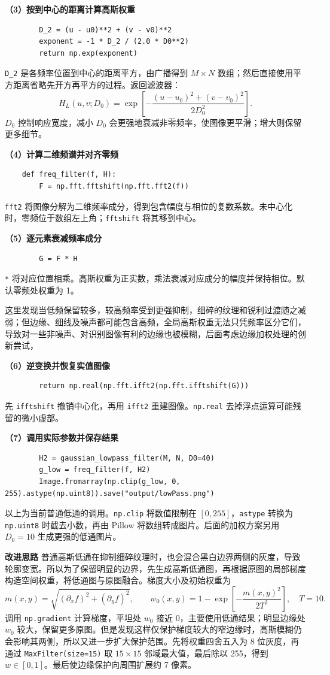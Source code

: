 \documentclass[UTF8,a4paper,zihao=5,fontset=fandol]{ctexart}
\begin{document}
\textbf{（3）按到中心的距离计算高斯权重}
{\small
\begin{verbatim}
        D_2 = (u - u0)**2 + (v - v0)**2
        exponent = -1 * D_2 / (2.0 * D0**2)
        return np.exp(exponent)
\end{verbatim}
}
\texttt{D\_2} 是各频率位置到中心的距离平方，由广播得到 $M\times N$ 数组；然后直接使用平方距离省略先开方再平方的过程。返回滤波器：
\[
H_L(u,v;D_0)=\exp\left[-\frac{(u-u_0)^2+(v-v_0)^2}{2D_0^2}\right].
\]
$D_0$ 控制响应宽度，减小 $D_0$ 会更强地衰减非零频率，使图像更平滑；增大则保留更多细节。

\textbf{（4）计算二维频谱并对齐零频}
{\small
\begin{verbatim}
    def freq_filter(f, H):
        F = np.fft.fftshift(np.fft.fft2(f))
\end{verbatim}
}
\texttt{fft2} 将图像分解为二维频率成分，得到包含幅度与相位的复数系数。未中心化时，零频位于数组左上角；\texttt{fftshift} 将其移到中心。

\textbf{（5）逐元素衰减频率成分}
{\small
\begin{verbatim}
        G = F * H
\end{verbatim}
}
\texttt{*} 将对应位置相乘。高斯权重为正实数，乘法衰减对应成分的幅度并保持相位。默认零频处权重为 1。

这里发现当低频保留较多，较高频率受到更强抑制，细碎的纹理和锐利过渡随之减弱；但边缘、细线及噪声都可能包含高频，全局高斯权重无法只凭频率区分它们，导致对一些非噪声、对识别图像有利的边缘也被模糊，后面考虑边缘加权处理的创新尝试，

\textbf{（6）逆变换并恢复实值图像}
{\small
\begin{verbatim}
        return np.real(np.fft.ifft2(np.fft.ifftshift(G)))
\end{verbatim}
}
先 \texttt{ifftshift} 撤销中心化，再用 \texttt{ifft2} 重建图像。\texttt{np.real} 去掉浮点运算可能残留的微小虚部。

\textbf{（7）调用实际参数并保存结果}
{\small
\begin{verbatim}
        H2 = gaussian_lowpass_filter(M, N, D0=40)
        g_low = freq_filter(f, H2)
        Image.fromarray(np.clip(g_low, 0, 255).astype(np.uint8)).save("output/lowPass.png")
\end{verbatim}
}
以上为当前普通低通的调用。\texttt{np.clip} 将数值限制在 $[0,255]$，\texttt{astype} 转换为 \texttt{np.uint8} 时截去小数，再由 Pillow 将数组转成图片。后面的加权方案另用 $D_0=10$ 生成更强的低通图片。

\textbf{改进思路 } 普通高斯低通在抑制细碎纹理时，也会混合黑白边界两侧的灰度，导致轮廓变宽。所以为了保留明显的边界，先生成高斯低通图，再根据原图的局部梯度构造空间权重，将低通图与原图融合。梯度大小及初始权重为
\[
m(x,y)=\sqrt{(\partial_x f)^2+(\partial_y f)^2},\qquad
w_0(x,y)=1-\exp\left[-\frac{m(x,y)^2}{2T^2}\right],\quad T=10.
\]
调用 \texttt{np.gradient} 计算梯度，平坦处 $w_0$ 接近 0，主要使用低通结果；明显边缘处 $w_0$ 较大，保留更多原图。但是发现这样仅保护梯度较大的窄边缘时，高斯模糊仍会影响其两侧，所以又进一步扩大保护范围。先将权重四舍五入为 8 位灰度，再通过 \texttt{MaxFilter(size=15)} 取 $15\times15$ 邻域最大值，最后除以 255，得到 $w\in[0,1]$。最后使边缘保护向周围扩展约 7 像素。
\end{document}
